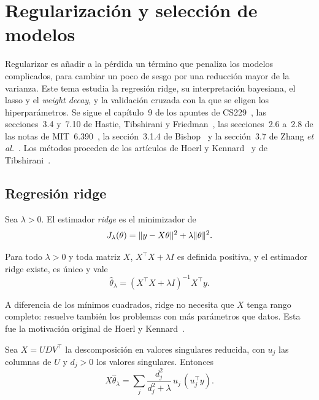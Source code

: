 \chapter{Regularización y selección de modelos}
\label{tema:6}

Regularizar es añadir a la pérdida un término que penaliza los modelos complicados, para cambiar un poco de sesgo por una reducción mayor de la varianza. Este tema estudia la regresión ridge, su interpretación bayesiana, el lasso y el \emph{weight decay}, y la validación cruzada con la que se eligen los hiperparámetros. Se sigue el capítulo~9 de los apuntes de CS229~\cite[§9.1--9.4]{cs229}, las secciones~3.4 y~7.10 de Hastie, Tibshirani y Friedman~\cite{esl}, las secciones~2.6 a~2.8 de las notas de MIT~6.390~\cite{mit6390}, la sección~3.1.4 de Bishop~\cite{bishop} y la sección~3.7 de Zhang \emph{et al.}~\cite{d2l}. Los métodos proceden de los artículos de Hoerl y Kennard~\cite{hoerl} y de Tibshirani~\cite{lasso}.

\section{Regresión ridge}

\begin{definicion}\label{def:ridge}
Sea $\lambda>0$. El estimador \emph{ridge} es el minimizador de
\[
J_\lambda(\theta)=\lVert y-X\theta\rVert^{2}+\lambda\lVert\theta\rVert^{2}.
\]
\end{definicion}

\begin{teorema}\label{teo:ridge}
Para todo $\lambda>0$ y toda matriz $X$, $X^{\top}X+\lambda I$ es definida positiva, y el estimador ridge existe, es único y vale
\[
\hat\theta_\lambda=(X^{\top}X+\lambda I)^{-1}X^{\top}y.
\]
\end{teorema}

A diferencia de los mínimos cuadrados, ridge no necesita que $X$ tenga rango completo: resuelve también los problemas con más parámetros que datos. Esta fue la motivación original de Hoerl y Kennard~\cite{hoerl}.

\begin{proposicion}\label{prop:ridge-svd}
Sea $X=UDV^{\top}$ la descomposición en valores singulares reducida, con $u_j$ las columnas de $U$ y $d_j>0$ los valores singulares. Entonces
\[
X\hat\theta_\lambda=\sum_{j}\frac{d_j^{2}}{d_j^{2}+\lambda}\,u_j\,(u_j^{\top}y).
\]
\end{proposicion}

